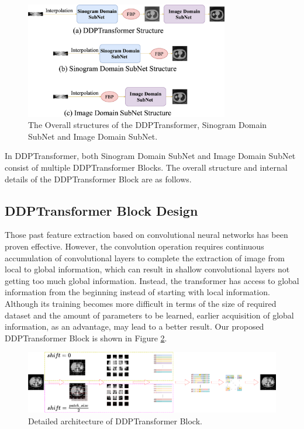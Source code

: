 \documentclass[lettersize,journal]{IEEEtran}
\begin{document}
\begin{figure}[!t]
	\centering
	\includegraphics[width=3.5in]{1.eps}
	\caption{The Overall structures of the DDPTransformer, Sinogram Domain SubNet and Image Domain SubNet.}
	\label{fig1}
\end{figure}

In DDPTransformer, both Sinogram Domain SubNet and Image Domain SubNet consist of multiple DDPTransformer Blocks. The overall structure and internal details of the DDPTransformer Block are as follows.

\subsection{DDPTransformer Block Design}

Those past feature extraction based on convolutional neural networks has been proven effective. However, the convolution operation requires continuous accumulation of convolutional layers to complete the extraction of image from local to global information, which can result in shallow convolutional layers not getting too much global information. Instead, the transformer has access to global information from the beginning instead of starting with local information. Although its training becomes more difficult in terms of the size of required dataset and the amount of parameters to be learned, earlier acquisition of global information, as an advantage, may lead to a better result. Our proposed DDPTransformer Block is shown in Figure \ref{fig2}.

\begin{figure}[!t]
	\centering
	\includegraphics[width=7in]{2.eps}
	\caption{Detailed architecture of DDPTransformer Block.}
	\label{fig2}
\end{figure}
\end{document}

